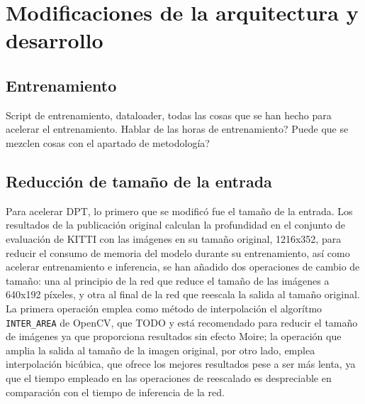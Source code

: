 \section{Modificaciones de la arquitectura y desarrollo}

\subsection{Entrenamiento}
Script de entrenamiento, dataloader, todas las cosas que se han hecho para acelerar el entrenamiento. Hablar de las horas de entrenamiento? Puede que se mezclen cosas con el apartado de metodología?

\subsection{Reducción de tamaño de la entrada}
Para acelerar DPT, lo primero que se modificó fue el tamaño de la entrada. Los resultados de la publicación original calculan la profundidad en el conjunto de evaluación de KITTI con las imágenes en su tamaño original, 1216x352, para reducir el consumo de memoria del modelo durante su entrenamiento, así como acelerar entrenamiento e inferencia, se han añadido dos operaciones de cambio de tamaño: una al principio de la red que reduce el tamaño de las imágenes a 640x192 píxeles, y otra al final de la red que reescala la salida al tamaño original. La primera operación emplea como método de interpolación el algorítmo \texttt{INTER{\_}AREA} de OpenCV, que TODO y está recomendado para reducir el tamaño de imágenes ya que proporciona resultados sin efecto Moire; la operación que amplia la salida al tamaño de la imagen original, por otro lado, emplea interpolación bicúbica, que ofrece los mejores resultados pese a ser más lenta, ya que el tiempo empleado en las operaciones de reescalado es despreciable en comparación con el tiempo de inferencia de la red.


